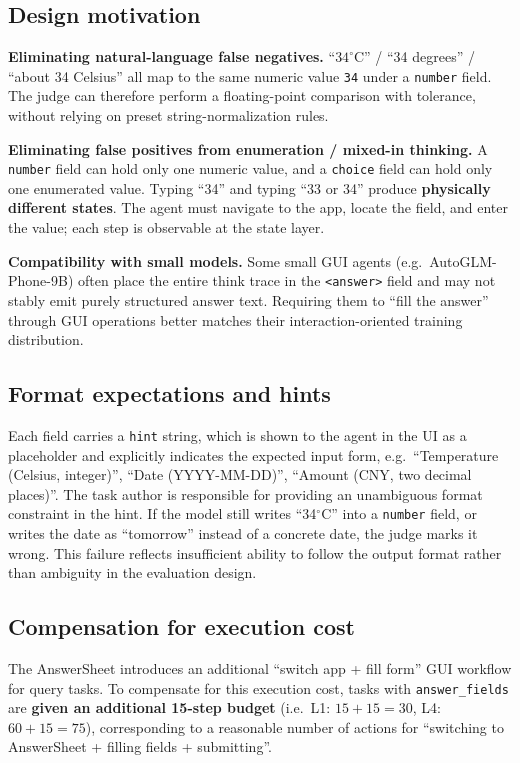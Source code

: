 \subsection{Design motivation}

\textbf{Eliminating natural-language false negatives.} ``$34^\circ$C'' / ``34 degrees'' / ``about 34 Celsius'' all map to the same numeric value \texttt{34} under a \texttt{number} field. The judge can therefore perform a floating-point comparison with tolerance, without relying on preset string-normalization rules.

\textbf{Eliminating false positives from enumeration / mixed-in thinking.} A \texttt{number} field can hold only one numeric value, and a \texttt{choice} field can hold only one enumerated value. Typing ``34'' and typing ``33 or 34'' produce \textbf{physically different states}. The agent must navigate to the app, locate the field, and enter the value; each step is observable at the state layer.

\textbf{Compatibility with small models.} Some small GUI agents (e.g.\ AutoGLM-Phone-9B) often place the entire think trace in the \texttt{<answer>} field and may not stably emit purely structured answer text. Requiring them to ``fill the answer'' through GUI operations better matches their interaction-oriented training distribution.

\subsection{Format expectations and hints}

Each field carries a \texttt{hint} string, which is shown to the agent in the UI as a placeholder and explicitly indicates the expected input form, e.g.\ ``Temperature (Celsius, integer)'', ``Date (YYYY-MM-DD)'', ``Amount (CNY, two decimal places)''. The task author is responsible for providing an unambiguous format constraint in the hint. If the model still writes ``34$^\circ$C'' into a \texttt{number} field, or writes the date as ``tomorrow'' instead of a concrete date, the judge marks it wrong. This failure reflects insufficient ability to follow the output format rather than ambiguity in the evaluation design.

\subsection{Compensation for execution cost}

The AnswerSheet introduces an additional ``switch app + fill form'' GUI workflow for query tasks. To compensate for this execution cost, tasks with \texttt{answer\_fields} are \textbf{given an additional 15-step budget} (i.e.\ L1: $15+15=30$, L4: $60+15=75$), corresponding to a reasonable number of actions for ``switching to AnswerSheet + filling fields + submitting''.


